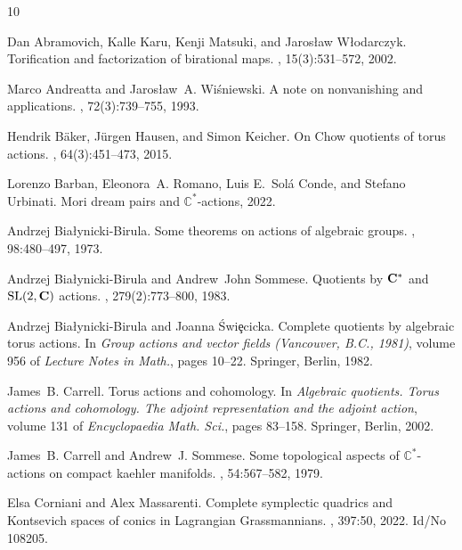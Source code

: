 \begin{thebibliography}{10}

Dan Abramovich, Kalle Karu, Kenji Matsuki, and Jaros{\l}aw W{\l}odarczyk.
\newblock Torification and factorization of birational maps.
, 15(3):531--572, 2002.

Marco Andreatta and Jaros{\l}aw~A. Wi\'{s}niewski.
\newblock A note on nonvanishing and applications.
, 72(3):739--755, 1993.

Hendrik B\"{a}ker, J\"{u}rgen Hausen, and Simon Keicher.
\newblock On {C}how quotients of torus actions.
, 64(3):451--473, 2015.

Lorenzo Barban, Eleonora~A. Romano, Luis E.~Sol\'a Conde, and Stefano Urbinati.
\newblock Mori dream pairs and $\mathbb{C}^*$-actions, 2022.

Andrzej Bia{\l}ynicki-Birula.
\newblock Some theorems on actions of algebraic groups.
, 98:480--497, 1973.

Andrzej Bia{\l}ynicki-Birula and Andrew~John Sommese.
\newblock Quotients by {${\bf C}\sp{\ast} $} and {${\rm SL}(2,{\bf C})$}
  actions.
, 279(2):773--800, 1983.

Andrzej Bia{\l}ynicki-Birula and Joanna \'Swi{\c e}cicka.
\newblock Complete quotients by algebraic torus actions.
\newblock In {\em Group actions and vector fields ({V}ancouver, {B}.{C}.,
  1981)}, volume 956 of {\em Lecture Notes in Math.}, pages 10--22. Springer,
  Berlin, 1982.

James~B. Carrell.
\newblock Torus actions and cohomology.
\newblock In {\em Algebraic quotients. {T}orus actions and cohomology. {T}he
  adjoint representation and the adjoint action}, volume 131 of {\em
  Encyclopaedia Math. Sci.}, pages 83--158. Springer, Berlin, 2002.

James~B. Carrell and Andrew~J. Sommese.
\newblock Some topological aspects of $\mathbb{C}^*$-actions on compact kaehler
  manifolds.
, 54:567--582, 1979.

Elsa Corniani and Alex Massarenti.
\newblock Complete symplectic quadrics and {Kontsevich} spaces of conics in
  {Lagrangian} {Grassmannians}.
, 397:50, 2022.
\newblock Id/No 108205.


\end{thebibliography}

